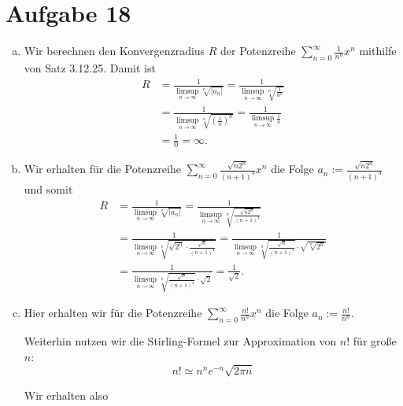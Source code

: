 \documentclass[12pt,a4paper]{article}
\begin{document}
\section*{Aufgabe 18}

\begin{enumerate}[(a)]
    \item Wir berechnen den Konvergenzradius $R$ der Potenzreihe $\sum\limits_{n=0}^{\infty} \frac{1}{n^n}x^n$ mithilfe von Satz 3.12.25.
    Damit ist
    \begin{align*}
        R &= \frac{1}{\limsup\limits_{n \to \infty} \sqrt[n]{|a_n|}}
        = \frac{1}{\limsup\limits_{n \to \infty} \sqrt[n]{\frac{1}{n^n}}}\\
        &= \frac{1}{\limsup\limits_{n \to \infty} \sqrt[n]{\left(\frac{1}{n}\right)^n}}
        = \frac{1}{\limsup\limits_{n \to \infty} \frac{1}{n}}\\
        &= \frac{1}{0} = \infty.
    \end{align*}

    \item Wir erhalten für die Potenzreihe $\sum\limits_{n=0}^{\infty} \frac{\sqrt{n2^n}}{(n+1)^4}x^n$ die Folge $a_n := \frac{\sqrt{n2^n}}{(n+1)^4}$ und somit
    \begin{align*}
        R &= \frac{1}{\limsup\limits_{n \to \infty} \sqrt[n]{|a_n|}}
        = \frac{1}{\limsup\limits_{n \to \infty} \sqrt[n]{\frac{\sqrt{n2^n}}{(n+1)^4}}}\\
        &= \frac{1}{\limsup\limits_{n \to \infty} \sqrt[n]{\sqrt{2^n} \cdot \frac{\sqrt{n}}{(n+1)^4}}}
        = \frac{1}{\limsup\limits_{n \to \infty} \sqrt[n]{\frac{\sqrt{n}}{(n+1)^4}} \cdot \sqrt{\sqrt[n]{2^n}}}\\
        &= \frac{1}{\limsup\limits_{n \to \infty} \sqrt[n]{\frac{\sqrt{n}}{(n+1)^4}} \cdot \sqrt{2}}
        = \frac{1}{\sqrt{2}}.
    \end{align*}

    \item Hier erhalten wir für die Potenzreihe $\sum\limits_{n=0}^{\infty} \frac{n!}{n^n}x^n$ die Folge $a_n := \frac{n!}{n^n}$.

    Weiterhin nutzen wir die Stirling-Formel zur Approximation von $n!$ für große $n$:
    \begin{equation}
        \label{eq1}
        n! \simeq n^ne^{-n}\sqrt{2 \pi n}
    \end{equation}

    Wir erhalten also


\end{enumerate}
\end{document}
